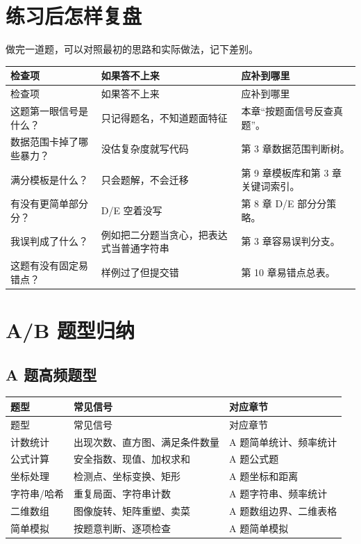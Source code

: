 \section{练习后怎样复盘}

做完一道题，可以对照最初的思路和实际做法，记下差别。

\begin{longtable}{p{3.0cm}p{5.2cm}p{5.4cm}}
\toprule
检查项 & 如果答不上来 & 应补到哪里 \\
\midrule
\endfirsthead
\toprule
检查项 & 如果答不上来 & 应补到哪里 \\
\midrule
\endhead
这题第一眼信号是什么？ & 只记得题名，不知道题面特征 & 本章“按题面信号反查真题”。 \\
数据范围卡掉了哪些暴力？ & 没估复杂度就写代码 & 第 3 章数据范围判断树。 \\
满分模板是什么？ & 只会题解，不会迁移 & 第 9 章模板库和第 3 章关键词索引。 \\
有没有更简单部分分？ & D/E 空着没写 & 第 8 章 D/E 部分分策略。 \\
我误判成了什么？ & 例如把二分题当贪心，把表达式当普通字符串 & 第 3 章容易误判分支。 \\
这题有没有固定易错点？ & 样例过了但提交错 & 第 10 章易错点总表。 \\
\bottomrule
\end{longtable}

\section{A/B 题型归纳}

\subsection{A 题高频题型}

\begin{longtable}{p{4cm}p{5cm}p{5cm}}
\toprule
题型 & 常见信号 & 对应章节 \\
\midrule
\endfirsthead
\toprule
题型 & 常见信号 & 对应章节 \\
\midrule
\endhead
计数统计 & 出现次数、直方图、满足条件数量 & A 题简单统计、频率统计 \\
公式计算 & 安全指数、现值、加权求和 & A 题公式题 \\
坐标处理 & 检测点、坐标变换、矩形 & A 题坐标和距离 \\
字符串/哈希 & 重复局面、字符串计数 & A 题字符串、频率统计 \\
二维数组 & 图像旋转、矩阵重塑、卖菜 & A 题数组边界、二维表格 \\
简单模拟 & 按题意判断、逐项检查 & A 题简单模拟 \\
\bottomrule
\end{longtable}

